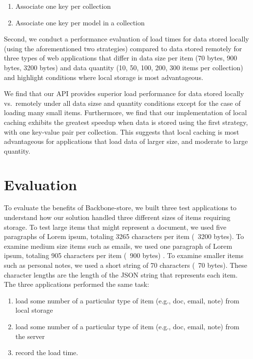 \documentclass[12pt]{article}
\begin{document}
\begin{enumerate}
\item Associate one key per collection
\item Associate one key per model in a collection
\end{enumerate}

Second, we conduct a performance evaluation of load times for data
stored locally (using the aforementioned two strategies) compared to data
stored remotely for three types of web applications that differ in data size
per item (70 bytes, 900 bytes, 3200 bytes) and data quantity (10, 50, 100, 200,
300 items per collection) and highlight conditions where local storage is most
advantageous.

We find that our API provides superior load performance for data
stored locally vs.\ remotely under all data sizse and quantity conditions except
for the case of loading many small items. Furthermore, we find that our
implementation of local caching exhibits the greatest speedup when data is
stored using the first strategy, with one key-value pair per collection. This
suggests that local caching is most advantageous for applications that load
data of larger size, and moderate to large quantity.

\section{Evaluation}

To evaluate the benefits of Backbone-store, we built three test applications to
understand how our solution handled three different sizes of items requiring
storage. To test large items that might represent a document, we used five
paragraphs of Lorem ipsum, totaling 3265 characters per item (~3200 bytes). To examine
medium size items such as emails, we used one paragraph of Lorem ipsum,
totaling 905 characters per item (~900 bytes) . To examine smaller items such as personal
notes, we used a short string of 70 characters (~70 bytes). These character lengths are the
length of the JSON string that represents each item. The three applications
performed the same task: 
\begin{enumerate}
\item load some number of a particular type of item (e.g., doc, email, note) from
local storage
\item load some number of a particular type of item (e.g., doc, email, note) from the server
\item record the load time.
\end{enumerate}
\end{document}
